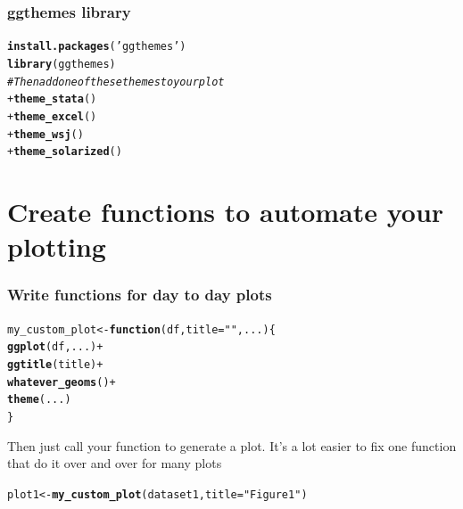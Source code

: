\documentclass{beamer}\usepackage[]{graphicx}\usepackage[]{color}
\makeatletter
\newcommand{\hlstr}[1]{\textcolor[rgb]{0.192,0.494,0.8}{#1}}%
\newcommand{\hlcom}[1]{\textcolor[rgb]{0.678,0.584,0.686}{\textit{#1}}}%
\newcommand{\hlopt}[1]{\textcolor[rgb]{0,0,0}{#1}}%
\newcommand{\hlstd}[1]{\textcolor[rgb]{0.345,0.345,0.345}{#1}}%
\newcommand{\hlkwa}[1]{\textcolor[rgb]{0.161,0.373,0.58}{\textbf{#1}}}%
\newcommand{\hlkwb}[1]{\textcolor[rgb]{0.69,0.353,0.396}{#1}}%
\newcommand{\hlkwc}[1]{\textcolor[rgb]{0.333,0.667,0.333}{#1}}%
\newcommand{\hlkwd}[1]{\textcolor[rgb]{0.737,0.353,0.396}{\textbf{#1}}}%
\newenvironment{kframe}{%
 \def\at@end@of@kframe{}%
 \ifinner\ifhmode%
  \def\at@end@of@kframe{\end{minipage}}%
  \begin{minipage}{\columnwidth}%
 \fi\fi%
 \def\FrameCommand##1{\hskip\@totalleftmargin \hskip-\fboxsep
 \colorbox{shadecolor}{##1}\hskip-\fboxsep
     \hskip-\linewidth \hskip-\@totalleftmargin \hskip\columnwidth}%
 \MakeFramed {\advance\hsize-\width
   \@totalleftmargin\z@ \linewidth\hsize
   \@setminipage}}%
 {\par\unskip\endMakeFramed%
 \at@end@of@kframe}
\newenvironment{knitrout}{}{} %
\makeatother
\begin{document}

\begin{frame}[fragile]
\frametitle{ggthemes library}
\begin{knitrout}\footnotesize
{}\color{fgcolor}\begin{kframe}
\begin{alltt}
\hlkwd{install.packages}\hlstd{(}\hlstr{'ggthemes'}\hlstd{)}
\hlkwd{library}\hlstd{(ggthemes)}
\hlcom{# Then add one of these themes to your plot}
 \hlopt{+} \hlkwd{theme_stata}\hlstd{()}
 \hlopt{+} \hlkwd{theme_excel}\hlstd{()}
 \hlopt{+} \hlkwd{theme_wsj}\hlstd{()}
 \hlopt{+} \hlkwd{theme_solarized}\hlstd{()}
\end{alltt}
\end{kframe}
\end{knitrout}
\end{frame}


\section*{Create functions to automate your plotting}
\frame{\sectionpage}


\begin{frame}[fragile]
\frametitle{Write functions for day to day plots}
\begin{knitrout}\footnotesize
{}\color{fgcolor}\begin{kframe}
\begin{alltt}
\hlstd{my_custom_plot} \hlkwb{<-} \hlkwa{function}\hlstd{(}\hlkwc{df}\hlstd{,} \hlkwc{title} \hlstd{=} \hlstr{""}\hlstd{,} \hlkwc{...}\hlstd{) \{}
    \hlkwd{ggplot}\hlstd{(df, ...)} \hlopt{+}
    \hlkwd{ggtitle}\hlstd{(title)} \hlopt{+}
    \hlkwd{whatever_geoms}\hlstd{()} \hlopt{+}
    \hlkwd{theme}\hlstd{(...)}
\hlstd{\}}
\end{alltt}
\end{kframe}
\end{knitrout}

Then just call your function to generate a plot.
It's a lot easier to fix one function that do it over and over for many plots
\begin{knitrout}\footnotesize
{}\color{fgcolor}\begin{kframe}
\begin{alltt}
\hlstd{plot1} \hlkwb{<-} \hlkwd{my_custom_plot}\hlstd{(dataset1,} \hlkwc{title} \hlstd{=} \hlstr{"Figure 1"}\hlstd{)}
\end{alltt}
\end{kframe}
\end{knitrout}

\end{frame}
\end{document}
